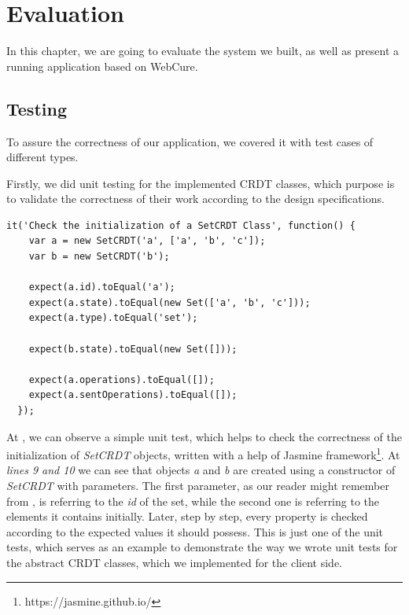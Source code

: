 \chapter{Evaluation}
\label{Evaluation}

In this chapter, we are going to evaluate the system we built, as well as present a running application based on WebCure. 

\section{Testing}

To assure the correctness of our application, we covered it with test cases of different types. 

Firstly, we did unit testing for the implemented CRDT classes, which purpose is to validate the correctness of their work according to the design specifications. 

\begin{lstlisting}[caption={[Unit test example for the \textit{SetCRDT} class]Simple unit test that checks the correct initialization of objects of a \textit{SetCRDT} class.}, label={lst:ev1}]
  it('Check the initialization of a SetCRDT Class', function() {
    var a = new SetCRDT('a', ['a', 'b', 'c']);
    var b = new SetCRDT('b');

    expect(a.id).toEqual('a');
    expect(a.state).toEqual(new Set(['a', 'b', 'c']));
    expect(a.type).toEqual('set');
    
    expect(b.state).toEqual(new Set([]));

    expect(a.operations).toEqual([]);
    expect(a.sentOperations).toEqual([]);
  });
\end{lstlisting}

At , we can observe a simple unit test, which helps to check the correctness of the initialization of \textit{SetCRDT} objects, written with a help of Jasmine framework\footnote{https://jasmine.github.io/}. At \textit{lines 9 and 10} we can see that objects \textit{a} and \textit{b} are created using a constructor of \textit{SetCRDT} with parameters. The first parameter, as our reader might remember from , is referring to the \textit{id} of the set, while the second one is referring to the elements it contains initially. Later, step by step, every property is checked according to the expected values it should possess. This is just one of the unit tests, which serves as an example to demonstrate the way we wrote unit tests for the abstract CRDT classes, which we implemented for the client side.

